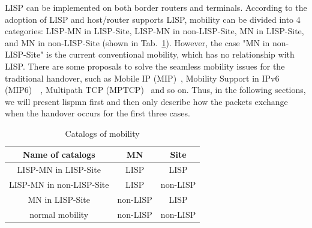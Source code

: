 LISP can be implemented on both border routers and terminals. %
According to the adoption of LISP and host/router supports LISP, mobility can be divided into 4 categories: LISP-MN in LISP-Site, LISP-MN in non-LISP-Site, MN in LISP-Site, and MN in non-LISP-Site (shown in Tab.~\ref{mobility_catalogs}). However, the case "MN in non-LISP-Site" is the current conventional mobility, which has no relationship with LISP. There are some proposals to solve the seamless mobility issues for the traditional handover, such as Mobile IP (MIP)~\cite{perkins1997mobile}, Mobility Support in IPv6 (MIP6)~\cite{perkins2011mobility}~\cite{minolisecurity}, Multipath TCP (MPTCP)~\cite{ford2013tcp} and so on. Thus, in the following sections, we will present \acrshort{lispmn} first and then only describe how the packets exchange when the handover occurs for the first three cases.

\begin{table}[!tb]
    \centering
    \caption{Catalogs of mobility}
    \label{mobility_catalogs}{
        \begin{tabular}{@{}c|c|c@{}}
			\hline\hline
    		Name of catalogs & MN  & Site    	\\  \hline 
    		LISP-MN in LISP-Site & LISP  & LISP    	\\  \hline 
    		LISP-MN in non-LISP-Site & LISP  & non-LISP    	\\  \hline    
    		MN in LISP-Site & non-LISP  & LISP    	\\  \hline    
    		normal mobility & non-LISP  & non-LISP    	\\  \hline \hline                   
    	\end{tabular}
    }
\end{table}


